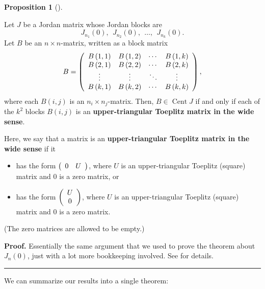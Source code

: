 \documentclass[numbers=enddot,12pt,final,onecolumn,notitlepage]{scrartcl}%
\numberwithin{exer}{subsection}
\theoremstyle{definition}
\newtheorem{prop}[theo]{Proposition}
\newenvironment{proposition}[1][]
{\begin{prop}[#1]\begin{leftbar}}
{\end{leftbar}\end{prop}}
\newenvironment{proof}[1][Proof]{\noindent\textbf{#1.} }{\ \rule{0.5em}{0.5em}}
\begin{document}
\begin{proposition}
Let $J$ be a Jordan matrix whose Jordan blocks are%
\[
J_{n_{1}}\left(  0\right)  ,\ \ J_{n_{2}}\left(  0\right)  ,\ \ \ldots
,\ \ J_{n_{k}}\left(  0\right)  .
\]
Let $B$ be an $n\times n$-matrix, written as a block matrix%
\[
B=\left(
\begin{array}
[c]{cccc}%
B\left(  1,1\right)  & B\left(  1,2\right)  & \cdots & B\left(  1,k\right) \\
B\left(  2,1\right)  & B\left(  2,2\right)  & \cdots & B\left(  2,k\right) \\
\vdots & \vdots & \ddots & \vdots\\
B\left(  k,1\right)  & B\left(  k,2\right)  & \cdots & B\left(  k,k\right)
\end{array}
\right)  ,
\]
where each $B\left(  i,j\right)  $ is an $n_{i}\times n_{j}$-matrix. Then,
$B\in\operatorname*{Cent}J$ if and only if each of the $k^{2}$ blocks
$B\left(  i,j\right)  $ is an \textbf{upper-triangular Toeplitz matrix in the
wide sense}.

Here, we say that a matrix is an \textbf{upper-triangular Toeplitz matrix in
the wide sense} if it

\begin{itemize}
\item has the form $\left(
\begin{array}
[c]{cc}%
0 & U
\end{array}
\right)  $, where $U$ is an upper-triangular Toeplitz (square) matrix and $0$
is a zero matrix, or

\item has the form $\left(
\begin{array}
[c]{c}%
U\\
0
\end{array}
\right)  $, where $U$ is an upper-triangular Toeplitz (square) matrix and $0$
is a zero matrix.
\end{itemize}

(The zero matrices are allowed to be empty.)
\end{proposition}

\begin{proof}
Essentially the same argument that we used to prove the theorem about
$J_{n}\left(  0\right)  $, just with a lot more bookkeeping involved. See
\cite[Proposition 3.1.2]{OmClVi11} for details.
\end{proof}

We can summarize our results into a single theorem:
\end{document}
